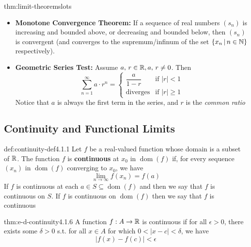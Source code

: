 \documentclass[landscape, 8pt]{extarticle}
\DeclareMathOperator{\dom}{dom}
\begin{document}
\begin{multicols}{3}
\begin{thm}{thm:limit-theorems}{lots}
\begin{itemize}
    \item \textbf{Monotone Convergence Theorem:} If a sequence of real numbers $(s_{n})$ is increasing and bounded above, or decreasing and bounded below, then $(s_{n})$ is convergent (and converges to the supremum/infinum of the set $\{x_{n}\,\vert\,n\in\mathbb{N}\}$ respectively).
    
    \item \textbf{Geometric Series Test:} Assume $a,\,r\in\mathbb{R}, a,\,r\ne 0$. Then
    \[\displaystyle\sum_{n=1}^{\infty} a\cdot r^n = \begin{cases}
    \dfrac{a}{1-r} &\text{if } \lvert r \rvert < 1 \\
    \text{diverges} &\text{if } \lvert r \rvert \ge 1
    \end{cases}
    \]
    Notice that $a$ is always the first term in the series, and $r$ is the \textit{common ratio}
    \vspace{-1pt}
\end{itemize}
\end{thm}
\vspace{-5pt}

\newpage

\subsection*{Continuity and Functional Limits}

\begin{dfn}[Continuity]{def:continuity-def}{4.1.1}
    Let $f$ be a real-valued function whose domain is a subset of $\mathbb{R}$. The function $f$ is \textbf{continuous} at $x_{0}$ in $\dom{(f)}$ if, for every sequence $(x_{n})$ in $\dom{(f)}$ converging to $x_{0}$, we have 
    \[\displaystyle\lim_{ n \to \infty }f(x_{n})=f(a)\]
    If $f$ is continuous at each $a\in S \subseteq \dom{(f)}$ and then we say that $f$ is continuous on $S$. If $f$ is continuous on $\dom{(f)}$ then we say that $f$ is continuous
\end{dfn}
\vspace{-5pt}

\begin{thm}{thm:e-d-continuity}{4.1.6}
    A function $f:A\to\mathbb{R}$ is continuous if for all $\epsilon>0$, there exists some $\delta>0$ s.t. for all $x \in A$ for which $0<\lvert x-c \rvert <\delta$, we have 
    \[\lvert f(x)-f(c) \rvert < \epsilon\]
\end{thm}
\vspace{-5pt}


\end{multicols}
\end{document}
